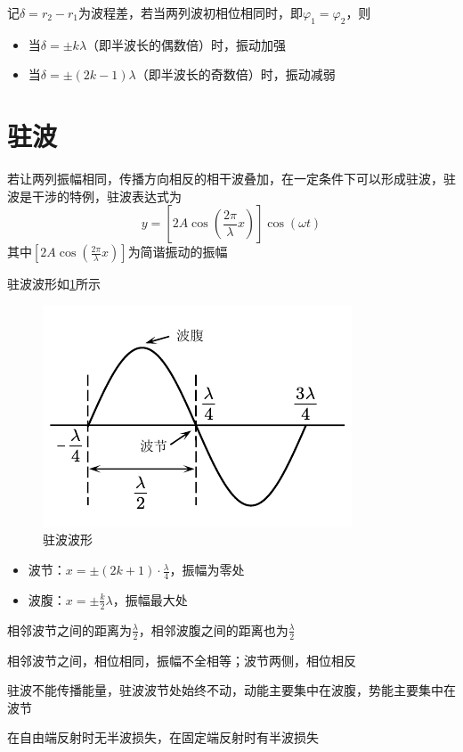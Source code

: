 \documentclass[12pt, a4paper, twoside]{ctexbook}
\begin{document}
记$\delta=r_2-r_1$为波程差，若当两列波初相位相同时，即$\varphi_1=\varphi_2$，则
\begin{itemize}
    \item 当$\delta=\pm k\lambda$（即半波长的偶数倍）时，振动加强
    \item 当$\delta=\pm \left(2k-1\right)\lambda$（即半波长的奇数倍）时，振动减弱
\end{itemize}
\section{驻波}
若让两列振幅相同，传播方向相反的相干波叠加，在一定条件下可以形成驻波，驻波是干涉的特例，驻波表达式为
$$
y=\left[2A\cos\left(\frac{2\pi}{\lambda}x\right)\right]\cos\left(\omega t\right)
$$
其中$\left[2A\cos\left(\frac{2\pi}{\lambda}x\right)\right]$为简谐振动的振幅

驻波波形如\textcolor{blue}{\cref{fig:驻波波形}}所示
\begin{figure}[H]
    \centerline{\includegraphics[scale=1.14]{驻波波形.pdf}}
    \caption{驻波波形}\label{fig:驻波波形}
\end{figure}

\begin{itemize}
    \item 波节：$x=\pm\left(2k+1\right)\cdot\frac{\lambda}{4}$，振幅为零处
    \item 波腹：$x=\pm\frac{k}{2}\lambda$，振幅最大处
\end{itemize}

相邻波节之间的距离为$\frac{\lambda}{2}$，相邻波腹之间的距离也为$\frac{\lambda}{2}$

相邻波节之间，相位相同，振幅不全相等；波节两侧，相位相反

驻波不能传播能量，驻波波节处始终不动，动能主要集中在波腹，势能主要集中在波节

在自由端反射时无半波损失，在固定端反射时有半波损失
\end{document}
